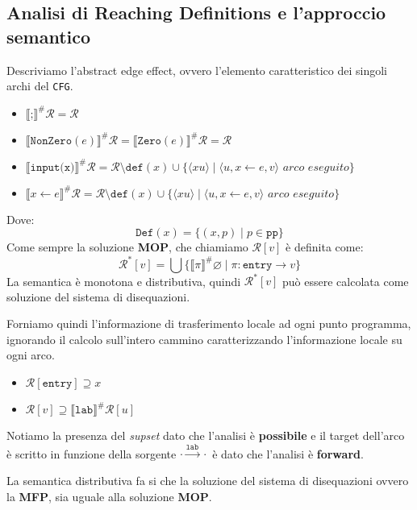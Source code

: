\subsection{Analisi di Reaching Definitions e l'approccio semantico}
Descriviamo l'abstract edge effect, ovvero l'elemento caratteristico dei singoli archi del \texttt{CFG}.
\begin{itemize}
    \item $\llbracket\texttt{;} \rrbracket^\# \mathcal{R} = \mathcal{R}$
    \item $\llbracket \texttt{NonZero}(e) \rrbracket^\# \mathcal{R} = 
    \llbracket \texttt{Zero}(e) \rrbracket^\# \mathcal{R}
    = \mathcal{R}$
    \item $\llbracket \texttt{input(x)} \rrbracket^\# \mathcal{R} =
        \mathcal{R} \setminus \texttt{def}(x) \cup \{\langle xu \rangle \mid 
        \langle u, x \gets e, v \rangle \textit{ arco eseguito}\}$
    \item $\llbracket x \gets e \rrbracket^\# \mathcal{R} = 
        \mathcal{R} \setminus \texttt{def}(x) \cup \{\langle xu \rangle \mid 
        \langle u, x \gets e, v \rangle \textit{ arco eseguito}\}$
\end{itemize}
Dove:
\[
    \texttt{Def}(x) = \{(x,p) \mid p \in \texttt{pp}\}
\]
Come sempre la soluzione \textbf{MOP}, che chiamiamo $\mathcal{R}[v]$ è definita come:
\[
    \mathcal{R}^*[v] = \bigcup \{ \llbracket \pi \rrbracket^\# \varnothing
    \mid \pi : \texttt{entry} \to v \}
\]
La semantica è monotona e distributiva, quindi $\mathcal{R}^* [v]$ può essere calcolata come 
soluzione del sistema di disequazioni.

Forniamo quindi l'informazione di trasferimento locale ad ogni punto programma, ignorando il calcolo 
sull'intero cammino caratterizzando l'informazione locale su ogni arco.

\begin{itemize}
    \item $\mathcal{R}[\texttt{entry}] \supseteq x$ 
    \item $\mathcal{R}[v] \supseteq \llbracket \texttt{lab}\rrbracket^\# \mathcal{R}[u]$
\end{itemize}
Notiamo la presenza del \textit{supset} dato che l'analisi è \textbf{possibile} e il target 
dell'arco è scritto in funzione della sorgente $\cdot \stackrel{\texttt{lab}}{\longrightarrow} \cdot$ è dato 
che l'analisi è \textbf{forward}.

La  semantica distributiva fa si che la soluzione del sistema di disequazioni ovvero la 
\textbf{MFP}, sia uguale alla soluzione \textbf{MOP}. 

